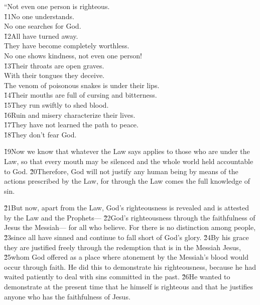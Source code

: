 \begin{poetry}
\poeml ``Not even one person is righteous. \\
\poeml \v{11}No one understands. \\
\poemll    No one searches for God. \\
\poeml \v{12}All have turned away. \\
\poemll    They have become completely worthless. \\
\poemlll       No one shows kindness, not even one person! \\
\poeml \v{13}Their throats are open graves. \\
\poemll    With their tongues they deceive. \\
\poemlll       The venom of poisonous snakes is under their lips. \\
\poeml \v{14}Their mouths are full of cursing and bitterness. \\
\poeml \v{15}They run swiftly to shed blood. \\
\poeml \v{16}Ruin and misery characterize their lives. \\
\poeml \v{17}They have not learned the path to peace. \\
\poeml \v{18}They don't fear God.
\end{poetry}

\v{19}Now we know that whatever the Law says applies to those who are under the Law, so that every mouth may be silenced and the whole world held accountable to God. \v{20}Therefore, God will not justify any human being by means of the actions prescribed by the Law, for through the Law comes the full knowledge of sin.

\v{21}But now, apart from the Law, God's righteousness is revealed and is attested by the Law and the Prophets--- \v{22}God's righteousness through the faithfulness of Jesus the Messiah--- for all who believe. For there is no distinction among people, \v{23}since all have sinned and continue to fall short of God's glory. \v{24}By his grace they are justified freely through the redemption that is in the Messiah Jesus, \v{25}whom God offered as a place where atonement by the Messiah's blood would occur through faith. He did this to demonstrate his righteousness, because he had waited patiently to deal with sins committed in the past. \v{26}He wanted to demonstrate at the present time that he himself is righteous and that he justifies anyone who has the faithfulness of Jesus.

